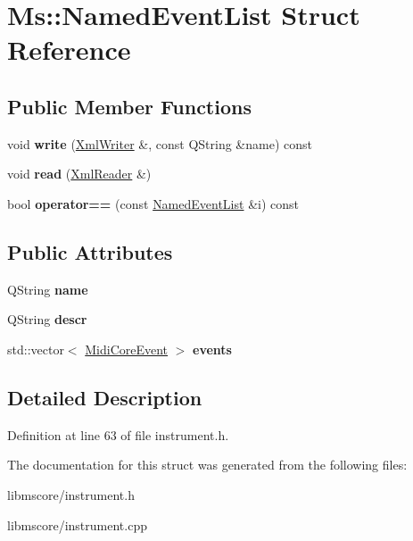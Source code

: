 \hypertarget{struct_ms_1_1_named_event_list}{}\section{Ms\+:\+:Named\+Event\+List Struct Reference}
\label{struct_ms_1_1_named_event_list}
\subsection*{Public Member Functions}
\begin{DoxyCompactItemize}
\item 
\mbox{\label{struct_ms_1_1_named_event_list_a7e31d720ff356cae66a410c786ab49d3}} 
void {\bfseries write} (\hyperlink{class_ms_1_1_xml_writer}{Xml\+Writer} \&, const Q\+String \&name) const
\item 
\mbox{\label{struct_ms_1_1_named_event_list_ab5788285b872d3741392b4565e16f1de}} 
void {\bfseries read} (\hyperlink{class_ms_1_1_xml_reader}{Xml\+Reader} \&)
\item 
\mbox{\label{struct_ms_1_1_named_event_list_a39ec931c42a6d62cc1205b1f9d8112af}} 
bool {\bfseries operator==} (const \hyperlink{struct_ms_1_1_named_event_list}{Named\+Event\+List} \&i) const
\end{DoxyCompactItemize}
\subsection*{Public Attributes}
\begin{DoxyCompactItemize}
\item 
\mbox{\label{struct_ms_1_1_named_event_list_a54e3d30202c6191b4a225a4bd1785d01}} 
Q\+String {\bfseries name}
\item 
\mbox{\label{struct_ms_1_1_named_event_list_a757bc3f874625cac31523b57e737fa7b}} 
Q\+String {\bfseries descr}
\item 
\mbox{\label{struct_ms_1_1_named_event_list_ab4008cdda5e1d7e265afa68e4d4e109a}} 
std\+::vector$<$ \hyperlink{class_ms_1_1_midi_core_event}{Midi\+Core\+Event} $>$ {\bfseries events}
\end{DoxyCompactItemize}


\subsection{Detailed Description}


Definition at line 63 of file instrument.\+h.



The documentation for this struct was generated from the following files\+:\begin{DoxyCompactItemize}
\item 
libmscore/instrument.\+h\item 
libmscore/instrument.\+cpp\end{DoxyCompactItemize}
